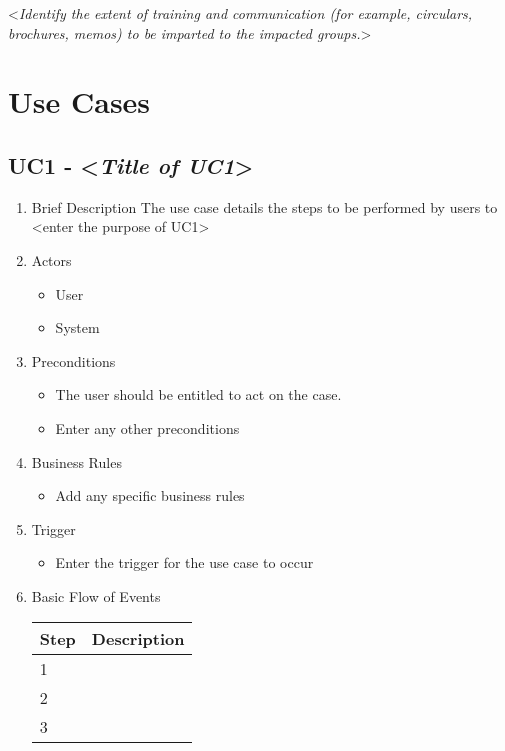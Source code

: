 \documentclass[english,12pt]{scrartcl}
\newcommand{\comment}[1]{\textless\textit{#1}\textgreater\vspace*{1ex}}
\begin{document}
\comment{Identify the extent of training and communication (for example, circulars, brochures, memos) to be imparted to the impacted groups.}
 
 
\section{Use Cases}
 
\subsection{UC1 - \comment{Title of UC1}}
 
\begin{enumerate}
\item Brief Description \newline The use case details the steps to be performed by users to <enter the purpose of UC1>
\item Actors
 
\begin{itemize}
\item <Enter name of application> User 
\item <Enter name of application> System
\end{itemize}
 
 
\item Preconditions
 
\begin{itemize}
\item The user should be entitled to act on the case.
\item Enter any other preconditions
\end{itemize}
 
 
\item Business Rules
 
\begin{itemize}
\item Add any specific business rules
\end{itemize}
 
\item Trigger 
 
\begin{itemize}
\item Enter the trigger for the use case to occur
\end{itemize}
 
\item Basic Flow of Events
 
\begin{tabular}{p{}p{}} \toprule
Step &	Description \\ \midrule
1	&    \\ 
2	&    \\ 
3	&    \\ \bottomrule
\end{tabular}
 
\end{enumerate}
 
\end{document}
